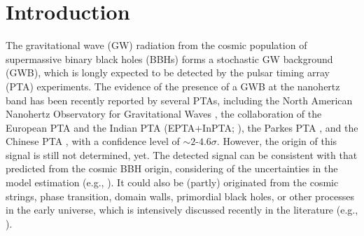 \documentclass[twocolumn]{aastex631}
\begin{document}

\section{Introduction}
%
\label{sec:Introduction}

The gravitational wave (GW) radiation from the cosmic population of supermassive
binary black holes (BBHs) forms a stochastic GW background (GWB), which is
longly expected to be detected by the pulsar timing array (PTA) experiments. The
evidence of the presence of a GWB at the nanohertz band has been recently
reported by several PTAs, including the North American Nanohertz Observatory for
Gravitational Waves \citep[NANOGrav;][]{NG23hd}, 
the collaboration of the European PTA and the Indian PTA (EPTA+InPTA;
\citealt{EPTA23hd}),
%
the Parkes PTA \citep[PPTA;][]{PPTA23hd}, and the Chinese PTA
\citep[CPTA;][]{CPTA23hd}, with a confidence level of $\sim 2$-$4.6\sigma$.
However, the origin of this signal is still not determined, yet. 
The detected signal can be consistent with that predicted from 
the cosmic BBH origin, considering of the uncertainties in the model estimation
(e.g., \citealt{CYL23cgws, Muhamed23, NG23constraint, EPTA23constraint,
Curylo23, Becsy23}). It could also be (partly) originated from the cosmic
strings, phase transition, domain walls, primordial black holes, or other
processes in the early universe, which is intensively discussed recently in the
literature (e.g., \citealt{BianLG23, NG23alter, EPTA23constraint, Ellis23}). 
\end{document}
